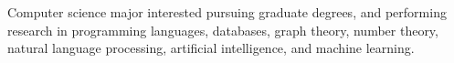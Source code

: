 Computer science major interested pursuing graduate degrees, and performing research in programming languages, databases, graph theory, number theory, natural language processing, artificial intelligence, and machine learning.
